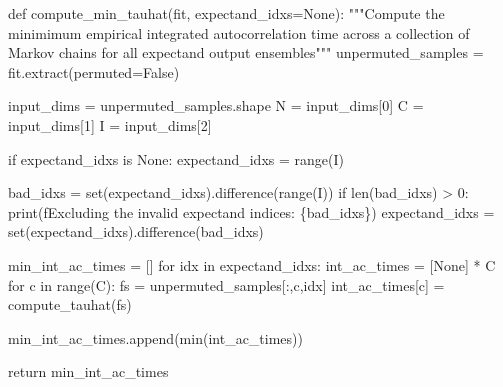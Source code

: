 \documentclass[
  letterpaper,
  DIV=11,
  numbers=noendperiod]{scrartcl}
\newenvironment{Shaded}{\begin{snugshade}}{\end{snugshade}}
\newcommand{\BuiltInTok}[1]{\textcolor[rgb]{0.00,0.23,0.31}{#1}}
\newcommand{\CommentTok}[1]{\textcolor[rgb]{0.37,0.37,0.37}{#1}}
\newcommand{\ControlFlowTok}[1]{\textcolor[rgb]{0.00,0.23,0.31}{#1}}
\newcommand{\DecValTok}[1]{\textcolor[rgb]{0.68,0.00,0.00}{#1}}
\newcommand{\KeywordTok}[1]{\textcolor[rgb]{0.00,0.23,0.31}{#1}}
\newcommand{\NormalTok}[1]{\textcolor[rgb]{0.00,0.23,0.31}{#1}}
\newcommand{\OperatorTok}[1]{\textcolor[rgb]{0.37,0.37,0.37}{#1}}
\newcommand{\SpecialCharTok}[1]{\textcolor[rgb]{0.37,0.37,0.37}{#1}}
\newcommand{\SpecialStringTok}[1]{\textcolor[rgb]{0.13,0.47,0.30}{#1}}
\newcommand{\VariableTok}[1]{\textcolor[rgb]{0.07,0.07,0.07}{#1}}
\begin{document}
\begin{Shaded}
\begin{Highlighting}[]
\KeywordTok{def}\NormalTok{ compute\_min\_tauhat(fit, expectand\_idxs}\OperatorTok{=}\VariableTok{None}\NormalTok{):}
  \CommentTok{"""Compute the minimimum empirical integrated autocorrelation time}
\CommentTok{     across a collection of Markov chains for all expectand output ensembles"""}
\NormalTok{  unpermuted\_samples }\OperatorTok{=}\NormalTok{ fit.extract(permuted}\OperatorTok{=}\VariableTok{False}\NormalTok{)}
  
\NormalTok{  input\_dims }\OperatorTok{=}\NormalTok{ unpermuted\_samples.shape}
\NormalTok{  N }\OperatorTok{=}\NormalTok{ input\_dims[}\DecValTok{0}\NormalTok{]}
\NormalTok{  C }\OperatorTok{=}\NormalTok{ input\_dims[}\DecValTok{1}\NormalTok{]}
\NormalTok{  I }\OperatorTok{=}\NormalTok{ input\_dims[}\DecValTok{2}\NormalTok{]}
  
  \ControlFlowTok{if}\NormalTok{ expectand\_idxs }\KeywordTok{is} \VariableTok{None}\NormalTok{:}
\NormalTok{    expectand\_idxs }\OperatorTok{=} \BuiltInTok{range}\NormalTok{(I)}
  
\NormalTok{  bad\_idxs }\OperatorTok{=} \BuiltInTok{set}\NormalTok{(expectand\_idxs).difference(}\BuiltInTok{range}\NormalTok{(I))}
  \ControlFlowTok{if} \BuiltInTok{len}\NormalTok{(bad\_idxs) }\OperatorTok{\textgreater{}} \DecValTok{0}\NormalTok{:}
    \BuiltInTok{print}\NormalTok{(}\SpecialStringTok{f\textquotesingle{}Excluding the invalid expectand indices: }\SpecialCharTok{\{}\NormalTok{bad\_idxs}\SpecialCharTok{\}}\SpecialStringTok{\textquotesingle{}}\NormalTok{)}
\NormalTok{    expectand\_idxs }\OperatorTok{=} \BuiltInTok{set}\NormalTok{(expectand\_idxs).difference(bad\_idxs)}

\NormalTok{  min\_int\_ac\_times }\OperatorTok{=}\NormalTok{ []}
  \ControlFlowTok{for}\NormalTok{ idx }\KeywordTok{in}\NormalTok{ expectand\_idxs:}
\NormalTok{    int\_ac\_times }\OperatorTok{=}\NormalTok{ [}\VariableTok{None}\NormalTok{] }\OperatorTok{*}\NormalTok{ C}
    \ControlFlowTok{for}\NormalTok{ c }\KeywordTok{in} \BuiltInTok{range}\NormalTok{(C):}
\NormalTok{      fs }\OperatorTok{=}\NormalTok{ unpermuted\_samples[:,c,idx]}
\NormalTok{      int\_ac\_times[c] }\OperatorTok{=}\NormalTok{ compute\_tauhat(fs)}
      
\NormalTok{    min\_int\_ac\_times.append(}\BuiltInTok{min}\NormalTok{(int\_ac\_times))}
  
  \ControlFlowTok{return}\NormalTok{ min\_int\_ac\_times}
\end{Highlighting}
\end{Shaded}
\end{document}
